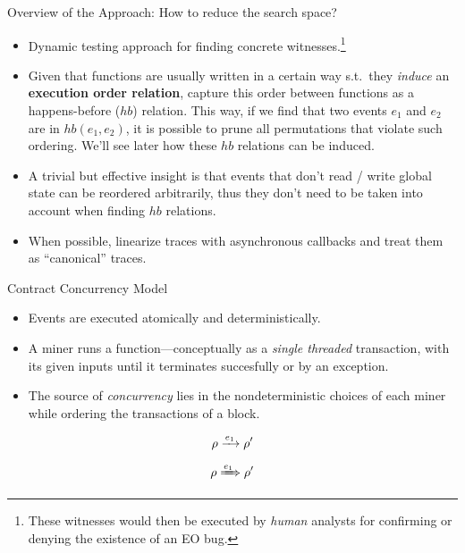 \documentclass[9pt]{beamer}
\begin{document}
\begin{frame}{Overview of the Approach: How to reduce the search space?}
  \begin{itemize}
  \item Dynamic testing approach for finding concrete
    witnesses.\footnote{These witnesses would then be executed by
      \emph{human} analysts for confirming or denying the existence of
      an EO bug.}
  \pause\item Given that functions are usually written in a certain
    way s.t.~they \emph{induce} an \textbf{execution order relation},
    capture this order between functions as a \alert{happens-before}
    ($\mathit{hb}$) relation.
    \pause
    This way, if we find that two events $e_1$ and $e_2$ are in
    $\mathit{hb}(e_1,e_2)$, it is possible to prune all permutations
    that violate such ordering.  We'll see later how these
    $\mathit{hb}$ relations can be induced.
  \pause\item A trivial but effective insight is that events that
    don't read / write global state can be \alert{reordered
      arbitrarily}, thus they don't need to be taken into account when
    finding $\mathit{hb}$ relations.
  \pause\item When possible, \alert{linearize} traces with
    asynchronous callbacks and treat them as ``canonical'' traces.
  \end{itemize}
\end{frame}
%
\begin{frame}{Contract Concurrency Model}
  \begin{itemize}
  \item Events are executed \alert{atomically} and
    \alert{deterministically}.
  \pause\item A miner runs a function---conceptually as a
    \emph{single threaded} transaction, with its given inputs until it
    terminates \alert{succesfully} or by an \alert{exception}.
  \pause\item The source of \emph{concurrency} lies in the nondeterministic
    choices of each miner while ordering the transactions of a block.  
  \end{itemize}
  \[\rho \estep{e_1} \rho'\]
  \[\rho \tstep{e_1} \rho'\]
\end{frame}
%
\end{document}
